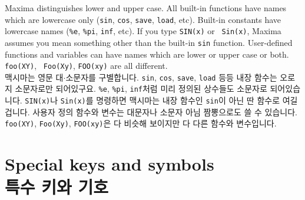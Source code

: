 \documentclass[a4paper,12pt]{article}
\begin{document}
Maxima distinguishes lower and upper case. All built-in functions 
have names which are lowercase only ({\tt sin}, {\tt cos}, {\tt save}, 
{\tt load}, etc). Built-in constants have lowercase names ({\tt \%e}, 
{\tt \%pi}, {\tt inf}, etc). If you type {\tt SIN(x)} or {\tt 
 Sin(x)}, Maxima assumes you mean something other than the built-in 
{\tt sin} function. User-defined functions and variables can have 
names which are lower or upper case or both. {\tt foo(XY)}, {\tt 
Foo(Xy)}, {\tt FOO(xy)} are all different. \\

맥시마는 영문 대$\cdot$소문자를 구별합니다. {\tt sin}, {\tt cos}, 
{\tt save}, {\tt load} 등등 내장 함수는 오로지 소문자로만 되어있구요. 
{\tt \%e}, {\tt \%pi}, {\tt inf}처럼 미리 정의된 상수들도 소문자로 되어있습니다.
{\tt SIN(x)}나 {\tt Sin(x)}를 명령하면 맥시마는 내장 함수인 {\tt sin}이 
아닌 딴 함수로 여길 겁니다. 사용자 정의 함수와 변수는 대문자나 소문자 아님 
짬뽕으로도 쓸 수 있습니다. {\tt foo(XY)}, {\tt Foo(Xy)}, {\tt FOO(xy)}은 
다 비슷해 보이지만 다 다른 함수와 변수입니다. 


\section{Special keys and symbols\\특수 키와 기호  \label{sec:keys}}
\end{document}
